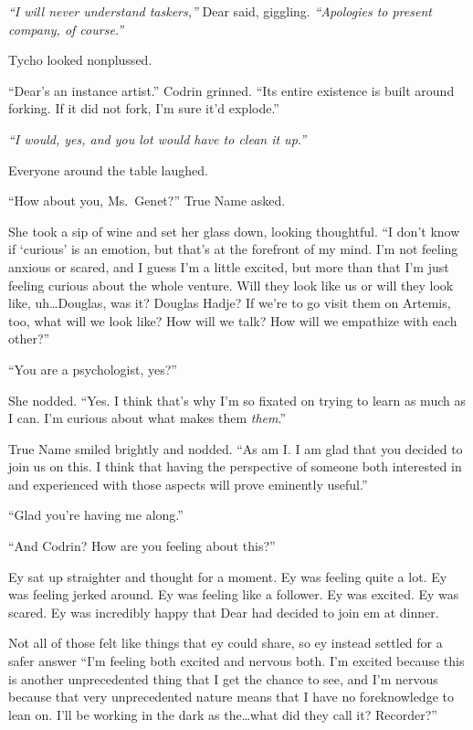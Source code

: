 \emph{``I will never understand taskers,''} Dear said, giggling. \emph{``Apologies to present company, of course.''}

Tycho looked nonplussed.

``Dear's an instance artist.'' Codrin grinned. ``Its entire existence is built around forking. If it did not fork, I'm sure it'd explode.''

\emph{``I would, yes, and you lot would have to clean it up.''}

Everyone around the table laughed.

``How about you, Ms.~Genet?'' True Name asked.

She took a sip of wine and set her glass down, looking thoughtful. ``I don't know if `curious' is an emotion, but that's at the forefront of my mind. I'm not feeling anxious or scared, and I guess I'm a little excited, but more than that I'm just feeling curious about the whole venture. Will they look like us or will they look like, uh\ldots Douglas, was it? Douglas Hadje? If we're to go visit them on Artemis, too, what will we look like? How will we talk? How will we empathize with each other?''

``You are a psychologist, yes?''

She nodded. ``Yes. I think that's why I'm so fixated on trying to learn as much as I can. I'm curious about what makes them \emph{them}.''

True Name smiled brightly and nodded. ``As am I. I am glad that you decided to join us on this. I think that having the perspective of someone both interested in and experienced with those aspects will prove eminently useful.''

``Glad you're having me along.''

``And Codrin? How are you feeling about this?''

Ey sat up straighter and thought for a moment. Ey was feeling quite a lot. Ey was feeling jerked around. Ey was feeling like a follower. Ey was excited. Ey was scared. Ey was incredibly happy that Dear had decided to join em at dinner.

Not all of those felt like things that ey could share, so ey instead settled for a safer answer ``I'm feeling both excited and nervous both. I'm excited because this is another unprecedented thing that I get the chance to see, and I'm nervous because that very unprecedented nature means that I have no foreknowledge to lean on. I'll be working in the dark as the\ldots what did they call it? Recorder?''


